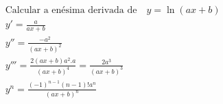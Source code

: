 \begin{ex}
\begin{align}
&\text{Calcular a enésima derivada de}\quad y=\ln{(ax+b)}\nonumber\\
&y'=\frac{a}{ax+b}\nonumber\\
&y''=\frac{-a^2}{(ax+b)^2}\nonumber\\
&y'''=\frac{2(ax+b)a^2.a}{(ax+b)^4}=\frac{2a^3}{(ax+b)^3}\nonumber\\
&y^{n}=\frac{(-1)^{n-1}(n-1)!a^{n}}{(ax+b)^{n}}\nonumber
\end{align}
\end{ex}